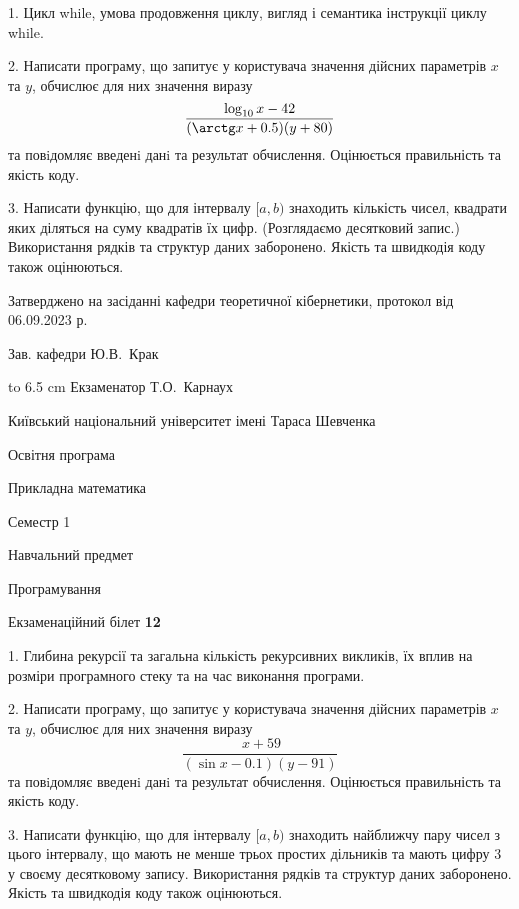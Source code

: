 \documentclass[12pt, ukrainian]{article}
\begin{document}
{%
1. Цикл while, умова продовження циклу, вигляд і семантика інструкції циклу while.%
\par
2. Написати програму, що запитує у користувача значення дійсних параметрів $x$ та $y$, обчислює для них значення виразу 
$$\frac{\log_{10} x - 42}{(\arctg x + 0.5) (y + 80)}$$ 
та повiдомляє введенi данi та результат обчислення.
 Оцінюється правильність та якість коду.

\par
3. Написати функцію, що для інтервалу $[a, b)$ знаходить кількість чисел, квадрати яких діляться на суму квадратів їх цифр. (Розглядаємо десятковий запис.)  Використання рядків та структур даних заборонено. Якість та швидкодія коду також оцінюються. 

}
{\smallskip\smallskip \begin {scriptsize} Затверджено на засіданні кафедри теоретичної кібернетики, протокол   від   06.09.2023 р.\par\smallskip\smallskip\smallskip\smallskip
{\parbox {6.5 cm} {Зав. кафедри \dotfill Ю.В.~Крак}}\hspace {0.7cm} {\hbox to 6.5 cm { Екзаменатор \dotfill Т.О.~Карнаух}} \end{scriptsize}}
\vspace{0.9cm}
{{\begin {scriptsize}\par
{ \center  Київський національний університет імені Тараса Шевченка \par}
{\parbox {5 cm}{Освітня програма \hfill}{\parbox {7 cm}{Прикладна математика\hfill}}\parbox {6 cm}{\hfill Семестр 1}}\par
{\parbox {5 cm} {Навчальний предмет \hfill}\parbox {7 cm}{Програмування \hfill}\parbox {6cm}{\hfill}\par}\vspace{-15pt} \end{scriptsize}}{\center Екзаменаційний білет \No \textbf { 12 }\par}}
{%
1. Глибина рекурсії та загальна кількість рекурсивних викликів, їх вплив на розміри програмного стеку та на час виконання програми.%
\par
2. Написати програму, що запитує у користувача значення дійсних параметрів $x$ та $y$, обчислює для них значення виразу 
$$\frac{\ x + 59}{(\sin x - 0.1) (y - 91)}$$ 
та повiдомляє введенi данi та результат обчислення.
 Оцінюється правильність та якість коду.

\par
3. Написати функцію, що для інтервалу $[a, b)$ знаходить найближчу пару чисел з цього інтервалу, що мають не менше трьох простих дільників та мають цифру 3 у своєму десятковому запису.  Використання рядків та структур даних заборонено. Якість та швидкодія коду також оцінюються. 

}
\end{document}
